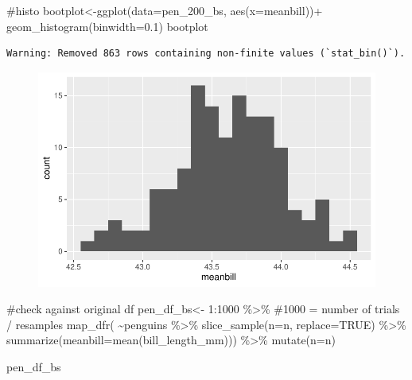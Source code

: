 \documentclass[
  letterpaper,
  DIV=11,
  numbers=noendperiod]{scrartcl}
\newenvironment{Shaded}{\begin{snugshade}}{\end{snugshade}}
\newcommand{\AttributeTok}[1]{\textcolor[rgb]{0.40,0.45,0.13}{#1}}
\newcommand{\CommentTok}[1]{\textcolor[rgb]{0.37,0.37,0.37}{#1}}
\newcommand{\ConstantTok}[1]{\textcolor[rgb]{0.56,0.35,0.01}{#1}}
\newcommand{\DecValTok}[1]{\textcolor[rgb]{0.68,0.00,0.00}{#1}}
\newcommand{\FloatTok}[1]{\textcolor[rgb]{0.68,0.00,0.00}{#1}}
\newcommand{\FunctionTok}[1]{\textcolor[rgb]{0.28,0.35,0.67}{#1}}
\newcommand{\NormalTok}[1]{\textcolor[rgb]{0.00,0.23,0.31}{#1}}
\newcommand{\OtherTok}[1]{\textcolor[rgb]{0.00,0.23,0.31}{#1}}
\newcommand{\SpecialCharTok}[1]{\textcolor[rgb]{0.37,0.37,0.37}{#1}}
\begin{document}
\begin{Shaded}
\begin{Highlighting}[]
\CommentTok{\#histo}
\NormalTok{bootplot}\OtherTok{\textless{}{-}}\FunctionTok{ggplot}\NormalTok{(}\AttributeTok{data=}\NormalTok{pen\_200\_bs, }\FunctionTok{aes}\NormalTok{(}\AttributeTok{x=}\NormalTok{meanbill))}\SpecialCharTok{+}
         \FunctionTok{geom\_histogram}\NormalTok{(}\AttributeTok{binwidth=}\FloatTok{0.1}\NormalTok{)}
\NormalTok{bootplot}
\end{Highlighting}
\end{Shaded}

\begin{verbatim}
Warning: Removed 863 rows containing non-finite values (`stat_bin()`).
\end{verbatim}

\begin{figure}[H]

{\centering \includegraphics{CIs_files/figure-pdf/unnamed-chunk-7-1.pdf}

}

\end{figure}

\begin{Shaded}
\begin{Highlighting}[]
\CommentTok{\#check against original df}
\NormalTok{pen\_df\_bs}\OtherTok{\textless{}{-}} \DecValTok{1}\SpecialCharTok{:}\DecValTok{1000} \SpecialCharTok{\%\textgreater{}\%} \CommentTok{\#1000 = number of trials / resamples}
  \FunctionTok{map\_dfr}\NormalTok{(}
    \SpecialCharTok{\textasciitilde{}}\NormalTok{penguins }\SpecialCharTok{\%\textgreater{}\%}
      \FunctionTok{slice\_sample}\NormalTok{(}\AttributeTok{n=}\NormalTok{n, }\AttributeTok{replace=}\ConstantTok{TRUE}\NormalTok{) }\SpecialCharTok{\%\textgreater{}\%}
      \FunctionTok{summarize}\NormalTok{(}\AttributeTok{meanbill=}\FunctionTok{mean}\NormalTok{(bill\_length\_mm))) }\SpecialCharTok{\%\textgreater{}\%}
  \FunctionTok{mutate}\NormalTok{(}\AttributeTok{n=}\NormalTok{n)}

\NormalTok{pen\_df\_bs }
\end{Highlighting}
\end{Shaded}
\end{document}
